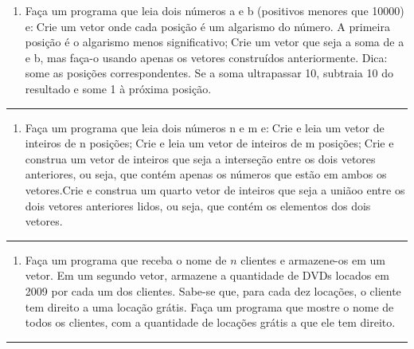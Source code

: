 \documentclass[12pt,a4paper]{article}
\providecommand{\tightlist}{%
      \setlength{\itemsep}{0pt}\setlength{\parskip}{0pt}}
\begin{document}
\begin{enumerate}
\def\labelenumi{\arabic{enumi}.}
\setcounter{enumi}{29}
\tightlist
\item
  Faça um programa que leia dois números a e b (positivos menores que
  10000) e:Crie um vetor onde cada posição é um algarismo do número. A
  primeira posição é o algarismo menos significativo;Crie um vetor que
  seja a soma de a e b, mas faça-o usando apenas os vetores construídos
  anteriormente. Dica: some as posições correspondentes. Se a soma
  ultrapassar 10, subtraia 10 do resultado e some 1 à próxima posição.
\end{enumerate}

    \begin{center}\rule{0.5\linewidth}{0.5pt}\end{center}

\begin{enumerate}
\def\labelenumi{\arabic{enumi}.}
\setcounter{enumi}{30}
\tightlist
\item
  Faça um programa que leia dois números n e m e:Crie e leia um vetor de
  inteiros de n posições;Crie e leia um vetor de inteiros de m
  posições;Crie e construa um vetor de inteiros que seja a interseção
  entre os dois vetores anteriores, ou seja, que contém apenas os
  números que estão em ambos os vetores.Crie e construa um quarto vetor
  de inteiros que seja a uniãoo entre os dois vetores anteriores lidos,
  ou seja, que contém os elementos dos dois vetores.
\end{enumerate}

    \begin{center}\rule{0.5\linewidth}{0.5pt}\end{center}

\begin{enumerate}
\def\labelenumi{\arabic{enumi}.}
\setcounter{enumi}{31}
\tightlist
\item
  Faça um programa que receba o nome de \(n\) clientes e armazene-os em
  um vetor. Em um segundo vetor, armazene a quantidade de DVDs locados
  em 2009 por cada um dos clientes. Sabe-se que, para cada dez locações,
  o cliente tem direito a uma locação grátis. Faça um programa que
  mostre o nome de todos os clientes, com a quantidade de locações
  grátis a que ele tem direito.
\end{enumerate}

    \begin{center}\rule{0.5\linewidth}{0.5pt}\end{center}
\end{document}
